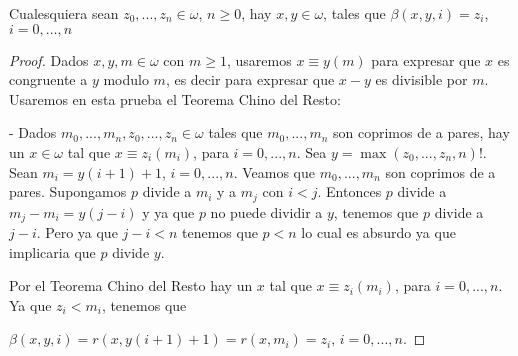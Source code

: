   \begin{lemma}
    Cualesquiera sean \(z_{0},...,z_{n}\in \omega \), \(n\geq 0\), hay \(x,y\in \omega \), tales que \(\beta (x,y,i)=z_{i}\), \(i=0,...,n\)
  \end{lemma}
  \begin{proof}
    Dados \(x,y,m\in \omega \) con \(m\geq 1\), usaremos \(x\equiv y(m)\) para expresar que \(x\) es congruente a \(y\) modulo \(m\), es decir para expresar que \( x-y\) es divisible por \(m\). Usaremos en esta prueba el Teorema Chino del Resto:

    - Dados \(m_{0},...,m_{n},z_{0},...,z_{n}\in \omega \) tales que \( m_{0},...,m_{n}\) son coprimos de a pares, hay un \(x\in \omega \) tal que \( x\equiv z_{i}(m_{i})\), para \(i=0,...,n.\)
    Sea \(y=\max (z_{0},...,z_{n},n)!\). Sean \(m_{i}=y(i+1)+1\), \(i=0,...,n\). Veamos que \(m_{0},...,m_{n}\) son coprimos de a pares. Supongamos \(p\) divide a \(m_{i}\) y a \(m_{j}\) con \(i< j\). Entonces \(p\) divide a \(m_{j}-m_{i}=y(j-i)\) y ya que \(p\) no puede dividir a \(y\), tenemos que \(p\) divide a \(j-i\). Pero ya que \(j-i< n\) tenemos que \(p< n\) lo cual es absurdo ya que implicaria que \(p\) divide \(y\).

    Por el Teorema Chino del Resto hay un \(x\) tal que \(x\equiv z_{i}(m_{i})\), para \(i=0,...,n\). Ya que \(z_{i}< m_{i}\), tenemos que

    \(\displaystyle \beta (x,y,i)=r(x,y(i+1)+1)=r(x,m_{i})=z_{i}\text{, }i=0,...,n\text{.} \)
  \end{proof}

